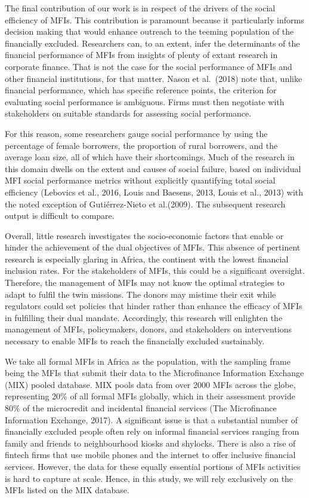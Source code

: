 \documentclass[
]{article}
\begin{document}
The final contribution of our work is in respect of the drivers of the
social efficiency of MFIs. This contribution is paramount because it
particularly informs decision making that would enhance outreach to the
teeming population of the financially excluded. Researchers can, to an
extent, infer the determinants of the financial performance of MFIs from
insights of plenty of extant research in corporate finance. That is not
the case for the social performance of MFIs and other financial
institutions, for that matter. Nason et al.~(2018) note that, unlike
financial performance, which has specific reference points, the
criterion for evaluating social performance is ambiguous. Firms must
then negotiate with stakeholders on suitable standards for assessing
social performance.

For this reason, some researchers gauge social performance by using the
percentage of female borrowers, the proportion of rural borrowers, and
the average loan size, all of which have their shortcomings. Much of the
research in this domain dwells on the extent and causes of social
failure, based on individual MFI social performance metrics without
explicitly quantifying total social efficiency (Lebovics et al., 2016,
Louis and Baesens, 2013, Louis et al., 2013) with the noted exception of
Gutiérrez-Nieto et al.(2009). The subsequent research output is
difficult to compare.

Overall, little research investigates the socio-economic factors that
enable or hinder the achievement of the dual objectives of MFIs. This
absence of pertinent research is especially glaring in Africa, the
continent with the lowest financial inclusion rates. For the
stakeholders of MFIs, this could be a significant oversight. Therefore,
the management of MFIs may not know the optimal strategies to adapt to
fulfil the twin missions. The donors may mistime their exit while
regulators could set policies that hinder rather than enhance the
efficacy of MFIs in fulfilling their dual mandate. Accordingly, this
research will enlighten the management of MFIs, policymakers, donors,
and stakeholders on interventions necessary to enable MFIs to reach the
financially excluded sustainably.

We take all formal MFIs in Africa as the population, with the sampling
frame being the MFIs that submit their data to the Microfinance
Information Exchange (MIX) pooled database. MIX pools data from over
2000 MFIs across the globe, representing 20\% of all formal MFIs
globally, which in their assessment provide 80\% of the microcredit and
incidental financial services (The Microfinance Information Exchange,
2017). A significant issue is that a substantial number of financially
excluded people often rely on informal financial services ranging from
family and friends to neighbourhood kiosks and shylocks. There is also a
rise of fintech firms that use mobile phones and the internet to offer
inclusive financial services. However, the data for these equally
essential portions of MFIs activities is hard to capture at scale.
Hence, in this study, we will rely exclusively on the MFIs listed on the
MIX database.
\end{document}
